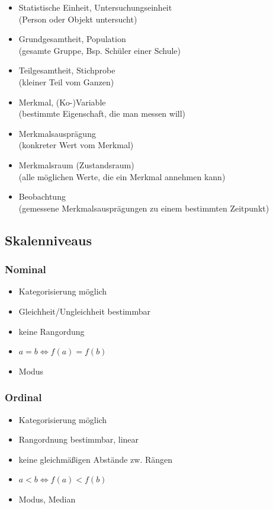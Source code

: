 \documentclass[10pt,a4paper,landscape]{article}
\begin{document}
\begin{multicols}{4}
\begin{itemize}
\item Statistische Einheit, Untersuchungseinheit \\
	(Person oder Objekt untersucht)
\item Grundgesamtheit, Population\\
	(gesamte Gruppe, Bsp. Schüler einer Schule)
\item Teilgesamtheit, Stichprobe\\
	(kleiner Teil vom Ganzen)
\item Merkmal, (Ko-)Variable\\
	(bestimmte Eigenschaft, die man messen will)
\item Merkmalsausprägung \\
	(konkreter Wert vom Merkmal)
\item Merkmalsraum (Zustandsraum)\\
	(alle möglichen Werte, die ein Merkmal annehmen kann)
\item Beobachtung\\
	(gemessene Merkmalsausprägungen zu einem bestimmten Zeitpunkt)
\end{itemize}

\subsection{Skalenniveaus}

\subsubsection*{Nominal}
\begin{itemize}
\item Kategorisierung möglich
\item Gleichheit/Ungleichheit bestimmbar
\item keine Rangordung
\item $a=b \Leftrightarrow f(a)=f(b)$
\item Modus 
\end{itemize}

\subsubsection*{Ordinal}
\begin{itemize}
\item Kategorisierung möglich
\item Rangordnung bestimmbar, linear
\item keine gleichmäßigen Abstände zw. Rängen
\item $a<b \Leftrightarrow f(a)<f(b)$
\item Modus, Median
\end{itemize}


\end{multicols}
\end{document}
